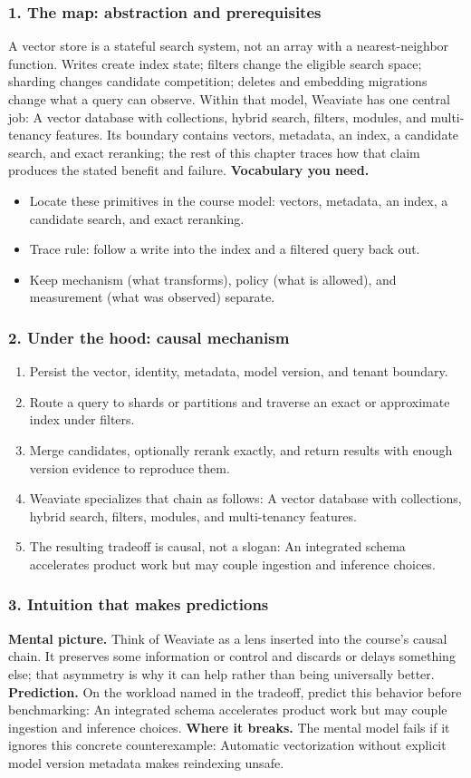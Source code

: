\subsubsection*{1. The map: abstraction and prerequisites}
A vector store is a stateful search system, not an array with a nearest-neighbor function. Writes create index state; filters change the eligible search space; sharding changes candidate competition; deletes and embedding migrations change what a query can observe.
Within that model, Weaviate has one central job: A vector database with collections, hybrid search, filters, modules, and multi-tenancy features. Its boundary contains vectors, metadata, an index, a candidate search, and exact reranking; the rest of this chapter traces how that claim produces the stated benefit and failure.
\textbf{Vocabulary you need.}\begin{itemize}
\item Locate these primitives in the course model: vectors, metadata, an index, a candidate search, and exact reranking.
\item Trace rule: follow a write into the index and a filtered query back out.
\item Keep mechanism (what transforms), policy (what is allowed), and measurement (what was observed) separate.
\end{itemize}
\subsubsection*{2. Under the hood: causal mechanism}\begin{enumerate}
\item Persist the vector, identity, metadata, model version, and tenant boundary.
\item Route a query to shards or partitions and traverse an exact or approximate index under filters.
\item Merge candidates, optionally rerank exactly, and return results with enough version evidence to reproduce them.
\item Weaviate specializes that chain as follows: A vector database with collections, hybrid search, filters, modules, and multi-tenancy features.
\item The resulting tradeoff is causal, not a slogan: An integrated schema accelerates product work but may couple ingestion and inference choices.
\end{enumerate}
\subsubsection*{3. Intuition that makes predictions}
\textbf{Mental picture.} Think of Weaviate as a lens inserted into the course's causal chain. It preserves some information or control and discards or delays something else; that asymmetry is why it can help rather than being universally better.
\textbf{Prediction.} On the workload named in the tradeoff, predict this behavior before benchmarking: An integrated schema accelerates product work but may couple ingestion and inference choices.
\textbf{Where it breaks.} The mental model fails if it ignores this concrete counterexample: Automatic vectorization without explicit model version metadata makes reindexing unsafe.
